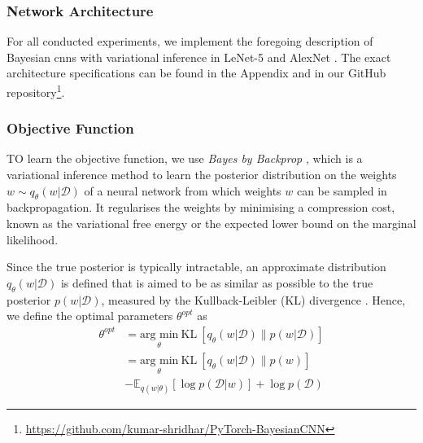 \subsubsection{Network Architecture}

For all conducted experiments, we implement the foregoing description of Bayesian \acp{cnn} with variational inference in LeNet-5 \cite{lecun1998gradient} and AlexNet \cite{krizhevsky2012imagenet}. The exact architecture specifications can be found in the Appendix and in our GitHub repository\footnote{\url{https://github.com/kumar-shridhar/PyTorch-BayesianCNN}}.

\subsubsection{Objective Function}
TO learn the objective function, we use \textit{Bayes by Backprop} \cite{graves2011practical, blundell2015weight}, which is a variational inference method to learn the posterior distribution on the weights $w \sim q_{\theta}(w|\mathcal{D})$ of a neural network from which weights $w$ can be sampled in backpropagation. 
It regularises the weights by minimising a compression cost, known as the variational free energy or the expected lower bound on the marginal likelihood.

Since the true posterior is typically intractable, an approximate distribution $q_{\theta}(w|\mathcal{D})$ is defined that is aimed to be as similar as possible to the true posterior $p(w|\mathcal{D})$, measured by the Kullback-Leibler (KL) divergence \cite{kullback1951information}. Hence, we define the optimal parameters $\theta^{opt}$ as
\begin{equation}
    \begin{aligned} \label{KL}
        \theta^{opt}&=\underset{\theta}{\text{arg min}}\ \text{KL} \ [q_{\theta}(w|\mathcal{D})\|p(w|\mathcal{D})] \\
        &=\underset{\theta}{\text{arg min}}\ \text{KL} \ [q_{\theta}(w|\mathcal{D})\|p(w)] \\ & -\mathbb{E}_{q(w|\theta)}[\log p(\mathcal{D}|w)]+\log p(\mathcal{D})
    \end{aligned}
\end{equation}

